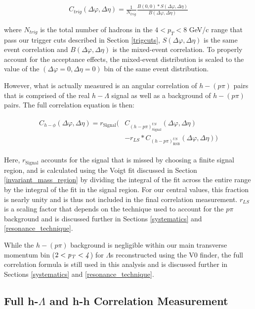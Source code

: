 \documentclass[ALICE,manyauthors]{ALICE_analysis_notes}
\begin{document}
\begin{itemize}
\begin{align}
\label{corrEq}
C_{trig}(\Delta\varphi, \Delta\eta) = \frac{1}{N_{trig}}\frac{B(0,0)*S(\Delta\varphi,\Delta\eta)}{B(\Delta\varphi, \Delta\eta)}
\end{align}

where $N_{trig}$ is the total number of hadrons in the $4 < p_{T} < 8$ GeV/c range that pass our trigger cuts described in Section \ref{trigcuts}, $S(\Delta\varphi, \Delta\eta)$ is the same event correlation and $B(\Delta\varphi, \Delta\eta)$ is the mixed-event correlation.  To properly account for the acceptance effects, the mixed-event distribution is scaled to the value of the $(\Delta\varphi = 0, \Delta\eta = 0)$ bin of the same event distribution.

However, what is actually measured is an angular correlation of $h-(p\pi)$ pairs that is comprised of the real $h-\Lambda$ signal as well as a background of $h-(p\pi)$ pairs. The full correlation equation is then:

\begin{align}
\label{corrEq_withBG}
\begin{split}
    C_{h-\phi}(\Delta\varphi, \Delta\eta) = r_{\text{Signal}}\biggl(&C_{(h-p\pi)^{US}_{\text{Signal}}}(\Delta\varphi, \Delta\eta)\\
    &- r_{LS}*C_{(h-p\pi)^{US}_{\text{RSB}}}(\Delta\varphi, \Delta\eta)\biggr)
\end{split}
\end{align}

Here, $r_{\text{Signal}}$ accounts for the signal that is missed by choosing a finite signal region, and is calculated using the Voigt fit discussed in Section \ref{invariant_mass_region} by dividing the integral of the fit across the entire range by the integral of the fit in the signal region. For our central values, this fraction is nearly unity and is thus not included in the final correlation measurement. $r_{LS}$ is a scaling factor that depends on the technique used to account for the $p\pi$ background and is discussed further in Sections \ref{systematics} and \ref{resonance_technique}.


While the $h-(p\pi)$ background is negligible within our main transverse momentum bin ($2 < \it{p}_{T} < 4$) for $\Lambda$s reconstructed using the V0 finder, the full correlation formula is still used in this analysis and is discussed further in Sections \ref{systematics} and \ref{resonance_technique}.


\subsection{Full h-$\Lambda$ and h-h Correlation Measurement}


\end{itemize}
\end{document}
